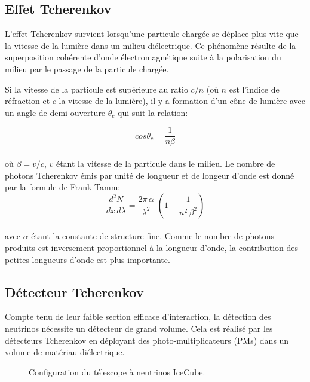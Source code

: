 \subsection{Effet Tcherenkov}

L'effet Tcherenkov survient lorsqu'une particule chargée se déplace plus vite que la vitesse de la lumière dans un milieu diélectrique. Ce phénomène résulte de la superposition cohérente d'onde électromagnétique suite à la polarisation du milieu par le passage de la particule chargée.

Si la vitesse de la particule est supérieure au ratio $c/n$ (où $n$ est l'indice de réfraction et $c$ la vitesse de la lumière), il y a formation d'un cône de lumière avec un angle de demi-ouverture $\theta_c$ qui suit la relation:

\begin{equation}
    cos\theta_c = \frac{1}{n\beta}
\end{equation}\\

où $\beta = v/c$, $v$ étant la vitesse de la particule dans le milieu. Le nombre de photons Tcherenkov émis par unité de longueur et de longeur d'onde est donné par la formule de Frank-Tamm: \\

\begin{equation}
     \frac{d^2N}{dx \, d\lambda} = \frac{2\pi \, \alpha}{\lambda^2} \; (1- \frac{1}{n^2 \, \beta^2} )
\end{equation}\\

avec $\alpha$ étant la constante de structure-fine. Comme le nombre de photons produits est inversement proportionnel à la longueur d'onde, la contribution des petites longueurs d'onde est plus importante.

\subsection{Détecteur Tcherenkov}

Compte tenu de leur faible section efficace d'interaction, la détection des neutrinos nécessite un détecteur de grand volume. Cela est réalisé par les détecteurs Tcherenkov en déployant des photo-multiplicateurs (PMs) dans un volume de matériau diélectrique.\\

\begin{figure}[h!]
    \caption{\label{fig:IceCube} Configuration du télescope à neutrinos IceCube.}
\end{figure}

